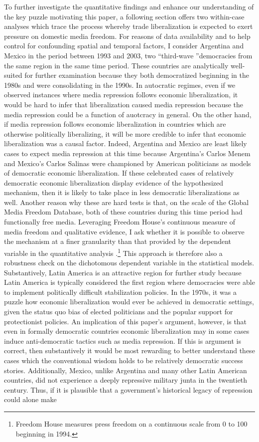 \documentclass[12pt,a4paper]{article}\usepackage[]{graphicx}\usepackage[]{color}
\begin{document}
To further investigate the quantitative findings and enhance our understanding of the key puzzle motivating this paper, a following section offers two within-case analyses which trace the process whereby trade liberalization is expected to exert pressure on domestic media freedom. For reasons of data availability and to help control for confounding spatial and temporal factors, I consider Argentina and Mexico in the period between 1993 and 2003, two ``third-wave ''democracies from the same region in the same time period. These countries are analytically well-suited for further examination because they both democratized beginning in the 1980s and were consolidating in the 1990s. In autocratic regimes, even if we observed instances where media repression follows economic liberalization, it would be hard to infer that liberalization caused media repression because the media repression could be a function of auotcracy in general. On the other hand, if media repression follows economic liberalization in countries which are otherwise politically liberalizing, it will be more credible to infer that economic liberalization was a causal factor. Indeed, Argentina and Mexico are least likely cases to expect media repression at this time because Argentina's Carlos Menem and Mexico's Carlos Salinas were championed by American politicians as models of democratic economic liberalization. If these celebrated cases of relatively democratic economic liberalization display evidence of the hypothesized mechanism, then it is likely to take place in less democratic liberalizations as well. Another reason why these are hard tests is that, on the scale of the Global Media Freedom Database, both of these countries during this time period had functionally free media. Leveraging Freedom House's continuous measure of media freedom and qualitative evidence, I ask whether it is possible to observe the mechanism at a finer granularity than that provided by the dependent variable in the quantitative analysis \parencite{FreedomHouse:2011vv}.\footnote{Freedom House measures press freedom on a continuous scale from 0 to 100 beginning in 1994.} This approach is therefore also a robustness check on the dichotomous dependent variable in the statistical models. Substantively, Latin America is an attractive region for further study because Latin America is typically considered the first region where democracies were able to implement politically difficult stabilization policies. In the 1970s, it was a puzzle how economic liberalization would ever be achieved in democratic settings, given the status quo bias of elected politicians and the popular support for protectionist policies. An implication of this paper's argument, however, is that even in formally democratic countries economic liberalization may in some cases induce anti-democratic tactics such as media repression. If this is argument is correct, then substantively it would be most rewarding to better understand these cases which the conventional wisdom holds to be relatively democratic success stories. Additionally, Mexico, unlike Argentina and many other Latin American countries, did not experience a deeply repressive military junta in the twentieth century. Thus, if it is plausible that a government's historical legacy of repression could alone make 
\end{document}
